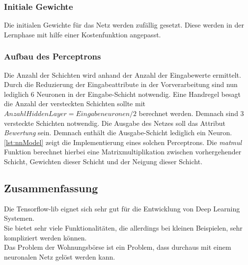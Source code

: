 \subsubsection{Initiale Gewichte}
Die initialen Gewichte für das Netz werden zufällig gesetzt. Diese werden in der Lernphase 
mit hilfe einer Kostenfunktion angepasst.

\subsubsection{Aufbau des Perceptrons}
Die Anzahl der Schichten wird anhand der Anzahl der Eingabewerte ermittelt. 
Durch die Reduzierung der Eingabeattribute in der Vorverarbeitung sind nun lediglich 6 Neuronen in 
der Eingabe-Schicht notwendig. Eine Handregel besagt die Anzahl der versteckten Schichten sollte mit
$Anzahl Hidden Layer = Eingabeneuronen/2$ berechnet werden. Demnach sind 3 versteckte Schichten notwendig. 
Die Ausgabe des Netzes soll das Attribut \textit{Bewertung} sein. Demnach enthält die 
Ausgabe-Schicht lediglich ein Neuron.\\
\autoref{lst:nnModel} zeigt die Implementierung eines solchen Perceptrons. Die \textit{matmul} Funktion 
berechnet hierbei eine Matrixmultiplikation zwischen vorhergehender Schicht, Gewichten dieser Schicht und der Neigung dieser Schicht.


\subsection{Zusammenfassung}
Die Tensorflow-lib eignet sich sehr gut für die Entwicklung von Deep Learning Systemen. \\
Sie bietet sehr viele Funktionalitäten, die allerdings bei kleinen Beispielen, sehr kompliziert 
werden können.\\
Das Problem der Wohnungsbörse ist ein Problem, dass durchaus mit einem neuronalen Netz gelöst werden kann. 


